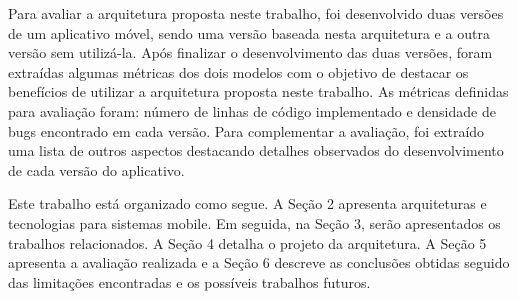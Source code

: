 Para avaliar a arquitetura proposta neste trabalho, foi desenvolvido duas versões de um aplicativo móvel, sendo uma versão baseada nesta arquitetura e a outra versão sem utilizá-la. Após finalizar o desenvolvimento das duas versões, foram extraídas algumas métricas dos dois modelos com o objetivo de destacar os benefícios de utilizar a arquitetura proposta neste trabalho. As métricas definidas para avaliação foram: número de linhas de código implementado e densidade de bugs encontrado em cada versão. Para complementar a avaliação, foi extraído uma lista de outros aspectos destacando detalhes observados do desenvolvimento de cada versão do aplicativo.

Este trabalho está organizado como segue. A Seção 2 apresenta arquiteturas e tecnologias para sistemas mobile. Em seguida, na Seção 3, serão apresentados os trabalhos relacionados. A Seção 4 detalha o projeto da arquitetura. A Seção 5 apresenta a avaliação realizada e a Seção 6 descreve as conclusões obtidas seguido das limitações encontradas e os possíveis trabalhos futuros.